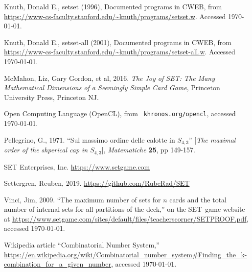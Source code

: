 \documentclass[10pt]{amsart}
\newcommand{\SETb}{SET\texttrademark\ } %
\begin{document}
\begin{thebibliography}{9} %


Knuth, Donald E., {\sc setset} (1996), Documented programs in
  CWEB, from
  \url{https://www-cs-faculty.stanford.edu/~knuth/programs/setset.w}. Accessed
  \today.

Knuth, Donald E., {\sc setset-all} (2001), Documented
  programs in CWEB, from
  \url{https://www-cs-faculty.stanford.edu/~knuth/programs/setset-all.w}. Accessed
  \today.

 McMahon, Liz, Gary Gordon, et al, 2016. {\em The Joy of SET: The
  Many Mathematical Dimensions of a Seemingly Simple Card Game}, Princeton
  University Press, Princeton NJ.

 Open Computing Language (OpenCL), from {\tt
  khronos.org/opencl}, accessed \today.

Pellegrino, G., 1971. ``Sul massimo ordine delle calotte in
  $S_{4,3}$'' [{\em The maximal order of the shperical cap in $S_{4,3}$}], {\em
  Matematiche} {\bf 25}, pp 149-157.

 SET Enterprises, Inc. \url{https://www.setgame.com}

Settergren, Reuben, 2019. \url{https://github.com/RubeRad/SET}
  
Vinci, Jim, 2009. ``The maximum number of sets for $n$ cards and
  the total number of internal sets for all partitions of the deck,'' on the
  \SETb game website at
  \url{https://www.setgame.com/sites/default/files/teacherscorner/SETPROOF.pdf},
  accessed \today.

 Wikipedia article ``Combinatorial Number System,'' \url{https://en.wikipedia.org/wiki/Combinatorial_number_system#Finding_the_k-combination_for_a_given_number},
  accessed \today.

\end{thebibliography}
 
\end{document}
